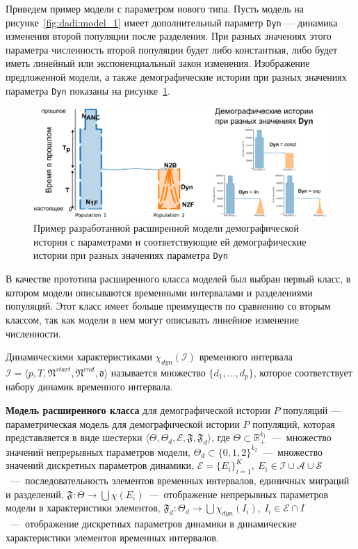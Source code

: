 Приведем пример модели с параметром нового типа. Пусть модель на рисунке~\ref{fig:dadi:model_1} имеет дополнительный параметр \texttt{Dyn} --- динамика изменения второй популяции после разделения.
При разных значениях этого параметра численность второй популяции будет либо константная, либо будет иметь линейный или экспоненциальный закон изменения.
Изображение предложенной модели, а также демографические истории при разных значениях параметра \texttt{Dyn} показаны на рисунке~\ref{fig:new_model:model}.
\begin{figure}[ht]
    \centering
    \includegraphics[width=\linewidth]{images_2/picture_2pops_model_3.pdf}
    \caption{Пример разработанной расширенной модели демографической истории с параметрами и соответствующие ей демографические истории при разных значениях параметра \texttt{Dyn}}
    \label{fig:new_model:model}
\end{figure}

В качестве прототипа расширенного класса моделей был выбран первый класс, в котором модели описываются временными интервалами и разделениями популяций.
Этот класс имеет больше преимуществ по сравнению со вторым классом, так как модели в нем могут описывать линейное изменение численности.

\vspace{-0.3cm}
 Динамическими характеристиками $\chi_{dyn}(\mathcal{I})$ временного интервала $\mathcal{I} = \langle p, T, \mathfrak{N}^{start}, \mathfrak{N}^{end}, \mathfrak{d} \rangle$ называется множество
$\{d_1, \ldots, d_p\}$, которое соответствует набору динамик временного интервала.

\vspace{-0.3cm}
 \textbf{Модель расширенного класса} для демографической истории $P$ популяций --- параметрическая модель для демографической истории $P$ популяций, которая представляется в виде шестерки ${\langle \Theta, \Theta_d, \mathcal{E}, \mathfrak{F}, \mathfrak{F}_{d}\rangle}$, где ${\Theta \subset \mathbb{R}_+^{k_1}}$~---~множество значений непрерывных параметров модели, ${\Theta_d \subset \{0, 1, 2\}^{k_2}}$~---~множество значений дискретных параметров динамики, ${\mathcal{E} = \{E_i\}_{i=1}^K,\ E_i \in \mathcal{I} \cup \mathcal{A} \cup \mathcal{S}}$~---~последовательность элементов временных интервалов, единичных миграций и разделений, ${\mathfrak{F}: \Theta \to  \bigcup \chi(E_i)}$~---~отображение непрерывных параметров модели в характеристики элементов, ${\mathfrak{F}_d: \Theta_d \to  \bigcup \chi_{dyn}(I_i),\ I_i \in \mathcal{E} \cap I}$~---~отображение дискретных параметров динамики в динамические характеристики элементов временных интервалов.

